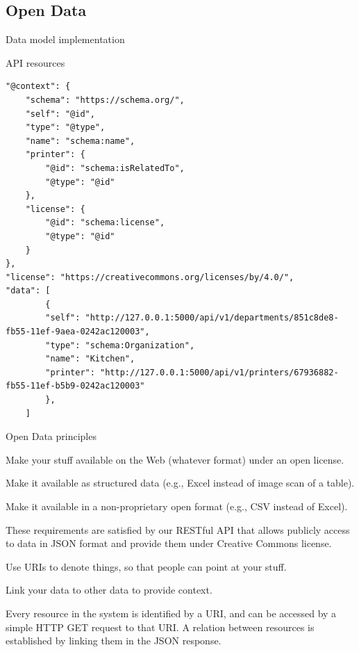 \subsection[Open Data]{Open Data}

\begin{frame}[allowframebreaks]{Data model implementation}
	
	
\end{frame}

\begin{frame}{API resources}
	
\end{frame}

\begin{frame}[fragile]
	\begin{lstlisting}[style=JSONStyle,caption={\texttt{GET /api/v1/departments} response}]
"@context": {
	"schema": "https://schema.org/",
	"self": "@id",
	"type": "@type",
	"name": "schema:name",
	"printer": {
		"@id": "schema:isRelatedTo",
		"@type": "@id"
	},
	"license": {
		"@id": "schema:license",
		"@type": "@id"
	}
},
"license": "https://creativecommons.org/licenses/by/4.0/",
"data": [
		{
		"self": "http://127.0.0.1:5000/api/v1/departments/851c8de8-fb55-11ef-9aea-0242ac120003",
		"type": "schema:Organization",
		"name": "Kitchen",
		"printer": "http://127.0.0.1:5000/api/v1/printers/67936882-fb55-11ef-b5b9-0242ac120003"
		},
	]
	\end{lstlisting}
\end{frame}

\begin{frame}[allowframebreaks]{Open Data principles}
	\begin{block}{\faStarO}
		Make your stuff available on the Web (whatever format) under an open
		license.
	\end{block}
	\begin{block}{\faStarO\faStarO}
		Make it available as structured data (e.g., Excel instead of image scan
		of a table).
	\end{block}
	\begin{block}{\faStarO\faStarO\faStarO}
		Make it available in a non-proprietary open format (e.g., CSV instead of
		Excel).
	\end{block}
	These requirements are satisfied by our RESTful API that allows
	publicly access to data in JSON format and provide them under Creative
	Commons license.

	\begin{block}{\faStarO\faStarO\faStarO\faStarO}
		Use URIs to denote things, so that people can point at your stuff.
	\end{block}
	\begin{block}{\faStarO\faStarO\faStarO\faStarO\faStarO}
		Link your data to other data to provide context.
	\end{block}
	Every resource in the system is identified by a URI, and can be accessed
	by a simple HTTP GET request to that URI. A relation between resources
	is established by linking them in the JSON response.

\end{frame}

